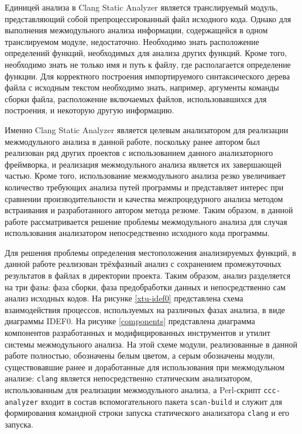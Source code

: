 Единицей анализа в Clang Static Analyzer является транслируемый модуль, представляющий собой препроцессированный файл исходного кода. Однако для выполнения межмодульного анализа информации, содержащейся в одном транслируемом модуле, недостаточно. Необходимо знать расположение определений функций, необходимых для анализа других функций. Кроме того, необходимо знать не только имя и путь к файлу, где располагается определение функции. Для корректного построения импортируемого синтаксического дерева файла с исходным текстом необходимо знать, например, аргументы команды сборки файла, расположение включаемых файлов, использовавшихся для построения, и некоторую другую информацию.

Именно Clang Static Analyzer является целевым анализатором для реализации межмодульного анализа в данной работе, поскольку ранее автором был реализован ряд других проектов с использованием данного анализаторного фреймворка, и реализация межмодульного анализа является их завершающей частью. Кроме того, использование межмодульного анализа резко увеличивает количество требующих анализа путей программы и представляет интерес при сравнении производительности и качества межпроцедурного анализа методом встраивания и разработанного автором метода резюме. Таким образом, в данной работе рассматривается решение проблемы межмодульного анализа для случая использования анализатором непосредственно исходного кода программы.

Для решения проблемы определения местоположения анализируемых функций, в данной работе реализован трёхфазный анализ с сохранением промежуточных результатов в файлах в директории проекта. Таким образом, анализ разделяется на три фазы: фаза сборки, фаза предобработки данных и непосредственно сам анализ исходных кодов. На рисунке \ref{xtu-idef0} представлена схема взаимодействия процессов, используемых на различных фазах анализа, в виде диаграммы IDEF0. На рисунке \ref{components} представлена диаграмма компонентов разработанных и модифицированных инструментов и утилит системы межмодульного анализа. На этой схеме модули, реализованные в данной работе полностью, обозначены белым цветом, а серым обозначены модули, существовавшие ранее и доработанные для использования при межмодульном анализе: \texttt{clang} является непосредственно статическим анализатором, использованным для реализации межмодульного анализа, а Perl-скрипт \texttt{ccc-analyzer} входит в состав вспомогательного пакета \texttt{scan-build} и служит для формирования командной строки запуска статического анализатора \texttt{clang} и его запуска.

